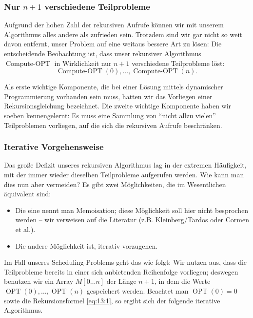 \documentclass[smaller]{beamer}
\DeclareMathOperator{\opt}{OPT}
\DeclareMathOperator{\copt}{Compute-OPT}
\begin{document}
\begin{frame}
 \frametitle{Nur $n+1$ verschiedene Teilprobleme}
 Aufgrund der hohen Zahl der rekursiven Aufrufe können wir mit unserem Algorithmus alles andere als zufrieden sein. Trotzdem sind wir gar nicht so weit davon entfernt, unser Problem auf eine weitaus bessere Art zu lösen: \alert{Die entscheidende Beobachtung ist, dass unser rekursiver Algorithmus $\copt$ in Wirklichkeit nur $n+1$ verschiedene Teilprobleme löst:}
\[
\copt{(0)}, \ldots, \copt{(n)}.
\]

Als \alert{erste wichtige Komponente}, die bei einer Lösung mittels dynamischer Programmierung\label{page:13:1} vorhanden sein muss, hatten wir das \alert{Vorliegen einer Rekursionsgleichung} bezeichnet. Die \alert{zweite wichtige Komponente} haben wir soeben kennengelernt: Es muss eine Sammlung von \enquote{nicht allzu vielen}  Teilproblemen vorliegen, auf die sich die rekursiven Aufrufe beschränken.
\end{frame}

\begin{frame}
 \frametitle{Iterative Vorgehensweise}
 Das große Defizit unseres rekursiven Algorithmus lag in der extremen Häufigkeit, mit der immer wieder dieselben Teilprobleme aufgerufen werden. Wie kann man dies nun aber vermeiden? Es gibt zwei Möglichkeiten, die im Wesentlichen äquivalent sind: 
\begin{itemize}
\item Die eine nennt man \alert{Memoisation}; diese Möglichkeit soll hier nicht besprochen werden -- wir verweisen auf die Literatur (z.B. Kleinberg/Tardos oder Cormen et al.).
\item Die andere Möglichkeit ist, \alert{iterativ} vorzugehen.
\end{itemize}

Im Fall unseres Scheduling-Problems geht das wie folgt: Wir nutzen aus, dass die Teilprobleme bereits in einer sich anbietenden Reihenfolge vorliegen; deswegen benutzen wir ein Array $M[0 \ldots n]$ der Länge $n+1$, in dem die Werte $\opt{(0)}, \ldots, \opt{(n)}$ gespeichert werden. Beachtet man $\opt{(0)}=0$ sowie die Rekursionsformel \eqref{eq:13:1}, \alert{so ergibt sich der folgende iterative Algorithmus}.
\end{frame}
\end{document}
